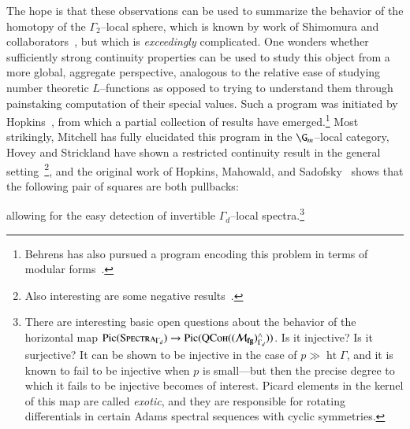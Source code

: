 The hope is that these observations can be used to summarize the behavior of the homotopy of the $\Gamma_2$--local sphere, which is known by work of Shimomura and collaborators~\cite{Shimomura,ShimomuraYabeM20,ShimomuraYabeL2S,BehrensRevisited}, but which is \emph{exceedingly} complicated.  One wonders whether sufficiently strong continuity properties can be used to study this object from a more global, aggregate perspective, analogous to the relative ease of studying number theoretic $L$--functions as opposed to trying to understand them through painstaking computation of their special values.  Such a program was initiated by Hopkins~\cite{StricklandpAdicInterpolation}, from which a partial collection of results have emerged.\footnote{Behrens has also pursued a program encoding this problem in terms of modular forms~\cite{BehrensCongruences,BehrensModularDescription,BehrensBuildings}.}  Most strikingly, Mitchell \cite{MitchellIwasawa,HahnMitchell} has fully elucidated this program in the $\G_m$--local category, Hovey and Strickland have shown a restricted continuity result in the general setting~\cite[Section 14]{HoveyStrickland}\footnote{Also interesting are some negative results~\cite[Section 15.2]{HoveyStrickland}.}, and the original work of Hopkins, Mahowald, and Sadofsky~\cite{HMS} shows that the following pair of squares are both pullbacks:
\begin{center}
\end{center}
allowing for the easy detection of invertible $\Gamma_d$--local spectra.\footnote{There are interesting basic open questions about the behavior of the horizontal map $\operatorname{Pic}(\normalfont\textsc{Spectra}_{\Gamma_d}) \to \operatorname{Pic}(\normalfont\textsc{QCoh}((\mathcal{M}_{\mathbf{fg}})^\wedge_{\Gamma_d}))$.  Is it injective?  Is it surjective?  It can be shown to be injective in the case of $p \gg \operatorname{ht} \Gamma$, and it is known to fail to be injective when $p$ is small---but then the precise degree to which it fails to be injective becomes of interest.  Picard elements in the kernel of this map are called \textit{exotic}, and they are responsible for rotating differentials in certain Adams spectral sequences with cyclic symmetries.}


